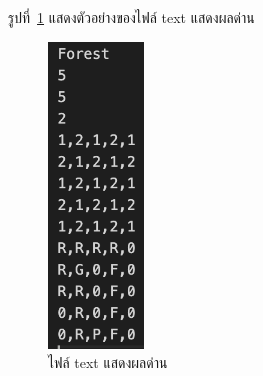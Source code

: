 รูปที่~\ref{ft1} แสดงตัวอย่างของไฟล์ text แสดงผลด่าน
\begin{figure}[h!]
    \begin{center}
    \includegraphics[width=1in]{pic-toro/filetext2.png}
    \end{center}
    \caption[ไฟล์ text แสดงผลด่าน]{ไฟล์ text แสดงผลด่าน}
    \label{ft1}
\end{figure}


